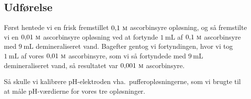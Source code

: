 \subsection*{Udførelse}
Først hentede vi en frisk fremstillet $0{,}1\ \textsc{m}$ ascorbinsyre
opløsning, og så fremstilte vi en $0{,}01\ \textsc{m}$ ascorbinsyre opløsning
ved at fortynde $1\ \unit{\milli\liter}$ af $0{,}1\ \textsc{m}$ ascorbinsyre
med $9\ \unit{\milli\liter}$ demineraliseret vand. Bagefter gentog vi
fortyndingen, hvor vi tog $1\ \unit{\milli\liter}$ af vores $0{,}01\
    \textsc{m}$ ascorbinsyre, som vi så fortyndede med $9\ \unit{\milli\liter}$
demineraliseret vand, så resultatet var $0{,}001 \ \textsc{m}$ ascorbinsyre.

Så skulle vi kalibrere pH-elektroden vha.~pufferopløsningerne, som vi brugte
til at måle pH-værdierne for vores tre opløsninger.